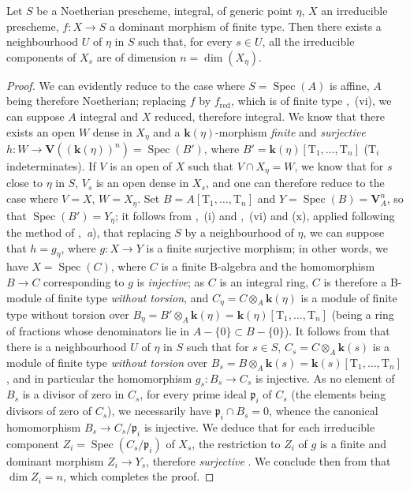 
\begin{corollary}[9.5.6]
\label{IV.9.5.6}
Let $S$ be a Noetherian prescheme, integral, of generic point $\eta$, $X$ an irreducible prescheme, $f:X\to S$ a dominant morphism of finite type.
Then there exists a neighbourhood $U$ of $\eta$ in $S$ such that, for every $s\in U$, all the irreducible components of $X_s$ are of dimension $n=\dim(X_\eta)$.
\end{corollary}

\begin{proof}
We can evidently reduce to the case where $S=\operatorname{Spec}(A)$ is affine, $A$ being therefore Noetherian; replacing $f$ by $f_{\mathrm{red}}$, which is of finite type ,~(vi), we can suppose $A$ integral and $X$ reduced, therefore integral.
We know  that there exists an open $W$ dense in $X_\eta$ and a $\boldsymbol{k}(\eta)$-morphism \emph{finite} and \emph{surjective} $h:W\to\mathbf{V}((\boldsymbol{k}(\eta))^n)=\operatorname{Spec}(B')$, where $B'=\boldsymbol{k}(\eta)[\mathrm{T}_1,\ldots,\mathrm{T}_n]$ ($\mathrm{T}_i$ indeterminates).
If $V$ is an open of $X$ such that $V\cap X_\eta=W$, we know  that for $s$ close to $\eta$ in $S$, $V_s$ is an open dense in $X_s$, and one can therefore  reduce to the case where $V=X$, $W=X_\eta$.
Set $B=A[\mathrm{T}_1,\ldots,\mathrm{T}_n]$ and $Y=\operatorname{Spec}(B)=\mathbf{V}_A^n$, so that $\operatorname{Spec}(B')=Y_\eta$; it follows from ,~(i) and ,~(vi) and (x), applied following the method of ,~\emph{a}), that replacing $S$ by a neighbourhood of $\eta$, we can suppose that $h=g_\eta$, where $g:X\to Y$ is a finite surjective morphism; in other words, we have $X=\operatorname{Spec}(C)$, where $C$ is a finite B-algebra and the homomorphism $B\to C$ corresponding to $g$ is \emph{injective}; as $C$ is an integral ring, $C$ is therefore a B-module of finite type \emph{without torsion}, and $C_\eta=C\otimes_A\boldsymbol{k}(\eta)$ is a module of finite type without torsion over $B_\eta=B'\otimes_A\boldsymbol{k}(\eta)=\boldsymbol{k}(\eta)[\mathrm{T}_1,\ldots,\mathrm{T}_n]$ (being a ring of fractions whose denominators lie in $A-\{0\}\subset B-\{0\}$).
It follows from  that there is a neighbourhood $U$ of $\eta$ in $S$ such that for $s\in S$, $C_s=C\otimes_A\boldsymbol{k}(s)$ is a module of finite type \emph{without torsion} over $B_s=B\otimes_A\boldsymbol{k}(s)=\boldsymbol{k}(s)[\mathrm{T}_1,\ldots,\mathrm{T}_n]$, and in particular the homomorphism $g_s:B_s\to C_s$ is injective.
As no element of $B_s$ is a divisor of zero in $C_s$, for every prime ideal $\mathfrak{p}_i$ of $C_s$ (the elements being divisors of zero of $C_s$), we necessarily have $\mathfrak{p}_i\cap B_s=0$, whence the canonical homomorphism $B_s\to C_s/\mathfrak{p}_i$ is injective.
We deduce that for each irreducible component $Z_i=\operatorname{Spec}(C_s/\mathfrak{p}_i)$ of $X_s$, the restriction to $Z_i$ of $g$ is a finite and dominant morphism $Z_i\to Y_s$, therefore \emph{surjective} .
We conclude then from  that $\dim Z_i=n$, which completes the proof.
\end{proof}

